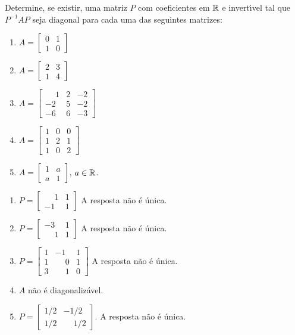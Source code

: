 \documentclass[12pt]{exam}
\begin{document}
\begin{exercicio}
  Determine, se existir, uma matriz $P$ com coeficientes em $\mathbb{R}$ e invert{\'\i}vel tal que $P^{-1}AP$ seja diagonal para cada uma das seguintes matrizes:
    \begin{enumerate}[label=({\alph*})]
      \item $A = \begin{bmatrix} 0 & 1\\ 1 & 0\end{bmatrix}$
      \item $A = \begin{bmatrix} 2 & 3\\ 1 & 4\end{bmatrix}$
      \item $A = \begin{bmatrix} \phantom{-} 1 & 2 & -2\\ -2 & 5 & -2\\ -6 & 6 & -3\end{bmatrix}$
      \item $A = \begin{bmatrix} 1 & 0 & 0\\ 1 & 2 & 1\\ 1 & 0 & 2\end{bmatrix}$
      \item $A = \begin{bmatrix} 1 & a \\ a & 1\end{bmatrix}$, $a \in \mathbb{R}$.
    \end{enumerate}
    \begin{solucao}
      \begin{enumerate}[label=({\alph*})]
        \item $P = \begin{bmatrix}
          \phantom{-} 1 & 1\\ -1 & 1
        \end{bmatrix}$ A resposta n\~ao \'e \'unica.
        \item $P = \begin{bmatrix}
          -3 & 1\\ \phantom{-} 1 & 1
        \end{bmatrix}$ A resposta n\~ao \'e \'unica.
        \item $P = \begin{bmatrix}
          1 & -1 & 1\\ 1 & \phantom{-} 0 & 1\\ 3 & \phantom{-} 1 & 0
        \end{bmatrix}$ A resposta n\~ao \'e \'unica.
        \item $A$ n\~ao \'e diagonaliz\'avel.
        \item $P = \begin{bmatrix} 1/2 & -1/2\\ 1/2 & \phantom{-} 1/2\end{bmatrix}$. A resposta n\~ao \'e \'unica.
      \end{enumerate}
    \end{solucao}

\end{exercicio}
\end{document}
